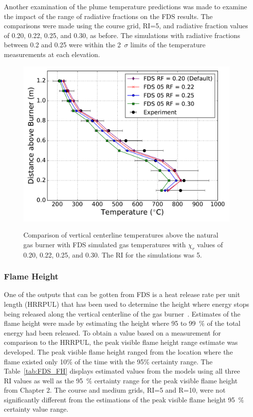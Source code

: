 \documentclass[twoside]{uocthesis}
\begin{document}
{Another examination of the plume temperature predictions was made to examine the impact of the range of radiative fractions on the FDS results.  The comparisons were made using the course grid, RI=5, and radiative fraction values of 0.20, 0.22, 0.25, and 0.30, as before. The simulations with radiative fractions between 0.2 and 0.25 were within the 2~$\sigma$ limits of the temperature measurements at each elevation.   

\begin{figure}
	\includegraphics[width=5in]{../Figures/FHNG01_RF_RI5} \\
	\caption[Comparison of vertical centerline temperatures above the natural gas burner with FDS simulated gas temperatures based on varied $\chi_r$.]{Comparison of vertical centerline temperatures above the natural gas burner with FDS simulated gas temperatures with $\chi_r$ values of 0.20, 0.22, 0.25, and 0.30.  The RI for the simulations was 5.}
	\label{FHNG01_RF_RI5}
\end{figure}

\subsubsection{Flame Height}

One of the outputs that can be gotten from FDS is a heat release rate per unit length (HRRPUL) that has been used to determine the height where energy stops being released along the vertical centerline of the gas burner~\cite{McDermott:2011}.  Estimates of the flame height were made by estimating the height where 95 to 99~$\%$ of the total energy had been released. To obtain a value based on a measurement for comparison to the HRRPUL, the peak visible flame height range estimate was developed.  The peak visible flame height ranged from the location where the flame existed only 10\% of the time with the 95\% certainty range.  The Table~\ref{tab:FDS_FH} displays estimated values from the models using all three RI values as well as the 95~$\%$ certainty range for the peak visible flame height from Chapter 2.  The course and medium grids, RI=5 and R=10, were not significantly different from the estimations of the peak visible flame height 95~$\%$ certainty value range.     

}
\end{document}
